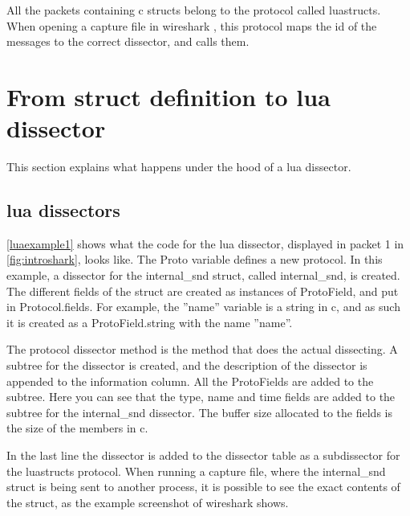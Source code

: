 All the \glspl{packet} containing \Gls{c} \glspl{struct} belong to the \gls{protocol} called luastructs.
When opening a capture file in \Gls{wireshark} , this \gls{protocol} maps the id of the messages to the correct \gls{dissector},
and calls them.



\section{From \gls{struct} definition to \Gls{lua} \gls{dissector}}
This section explains what happens under the hood of a \Gls{lua} \gls{dissector}.

\subsection{\Gls{lua} \glspl{dissector}}

\autoref{luaexample1} shows what the code for the \Gls{lua} \gls{dissector}, displayed in \gls{packet} 1 in \autoref{fig:introshark}, looks like.
The Proto variable defines a new \gls{protocol}. In this example, a \gls{dissector} for the internal\_snd \gls{struct}, called internal\_snd, is created. 
The different fields of the \gls{struct} are created as instances of ProtoField, and put in Protocol.fields.
For example, the ''name'' variable is a \gls{string} in \Gls{c}, and as such it is created as a ProtoField.\gls{string} with the 
name ''name''.

The \gls{protocol} \gls{dissector} method is the method that does the actual dissecting.
A subtree for the \gls{dissector} is created, and the description of the \gls{dissector} is appended to the information column.
All the ProtoFields are added to the subtree. Here you can see that the type, name and time fields are added to the subtree for the internal\_snd \gls{dissector}.
The buffer size allocated to the fields is the size of the \glspl{member} in \Gls{c}.

In the last line the \gls{dissector} is added to the \gls{dissector} table as a subdissector for the luastructs \gls{protocol}.
When running a capture file, where the internal\_snd \gls{struct} is being sent to another \gls{process}, it is possible to see the exact contents of the \gls{struct}, as the example screenshot of \Gls{wireshark} shows.

